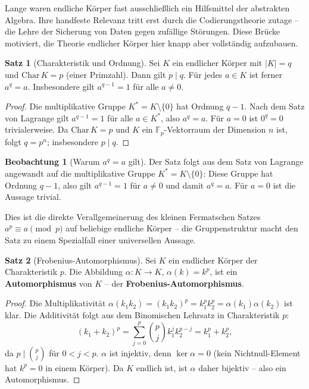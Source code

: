 ﻿\documentclass[a4paper,12pt]{report}
\theoremstyle{definition}
\newtheorem{satz}{Satz}
\newtheorem{beobachtung}{Beobachtung}
\begin{document}
Lange waren endliche Körper fast ausschließlich ein Hilfsmittel der
abstrakten Algebra. Ihre handfeste Relevanz tritt erst durch die
Codierungstheorie zutage -- die Lehre der Sicherung von Daten gegen
zufällige Störungen. Diese Brücke motiviert, die Theorie endlicher
Körper hier knapp aber vollständig aufzubauen.

\begin{satz}[Charakteristik und Ordnung]
    Sei $K$ ein endlicher Körper mit $|K| = q$ und $\mathrm{Char}\, K = p$
    (einer Primzahl). Dann gilt $p \mid q$. Für jedes $a \in K$ ist ferner
    $a^q = a$. Insbesondere gilt $a^{q-1} = 1$ für alle $a \neq 0$.
\end{satz}
\begin{proof}
    Die multiplikative Gruppe $K^* = K \setminus \{0\}$ hat Ordnung $q - 1$.
    Nach dem Satz von Lagrange gilt $a^{q-1} = 1$ für alle $a \in K^*$,
    also $a^q = a$. Für $a = 0$ ist $0^q = 0$ trivialerweise. Da
    $\mathrm{Char}\, K = p$ und $K$ ein $\mathbb{F}_p$-Vektorraum der
    Dimension $n$ ist, folgt $q = p^n$; insbesondere $p \mid q$.
\end{proof}


\begin{beobachtung}[Warum \texorpdfstring{$a^q = a$}{a^q = a} gilt]
    Der Satz folgt aus dem Satz von Lagrange angewandt auf die multiplikative
    Gruppe $K^* = K \setminus \{0\}$: Diese Gruppe hat Ordnung $q - 1$,
    also gilt $a^{q-1} = 1$ für $a \neq 0$ und damit $a^q = a$.
    Für $a = 0$ ist die Aussage trivial.

    Dies ist die direkte Verallgemeinerung des kleinen Fermatschen Satzes
    $a^p \equiv a \pmod{p}$ auf beliebige endliche Körper -- die Gruppenstruktur
    macht den Satz zu einem Spezialfall einer universellen Aussage.
\end{beobachtung}

\begin{satz}[Frobenius-Automorphismus]
    Sei $K$ ein endlicher Körper der Charakteristik $p$. Die Abbildung
    $\alpha : K \to K$, $\alpha(k) = k^p$, ist ein \textbf{Automorphismus}
    von $K$ -- der \textbf{Frobenius-Automorphismus}.
\end{satz}
\begin{proof}
    Die Multiplikativität $\alpha(k_1 k_2) = (k_1 k_2)^p = k_1^p k_2^p
    = \alpha(k_1)\alpha(k_2)$ ist klar.
    Die Additivität folgt aus dem Binomischen Lehrsatz in Charakteristik $p$:
    \[
        (k_1 + k_2)^p = \sum_{j=0}^p \binom{p}{j} k_1^j k_2^{p-j}
        = k_1^p + k_2^p,
    \]
    da $p \mid \binom{p}{j}$ für $0 < j < p$.
    $\alpha$ ist injektiv, denn $\ker \alpha = 0$ (kein Nichtnull-Element
    hat $k^p = 0$ in einem Körper). Da $K$ endlich ist, ist $\alpha$ daher
    bijektiv -- also ein Automorphismus.
\end{proof}
\end{document}
